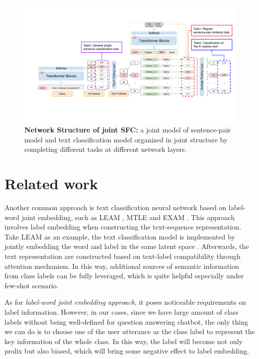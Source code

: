 \documentclass[letterpaper]{article} %
\begin{document}
  \begin{figure}[t]
    \begin{centering}
      \includegraphics[scale=0.72]{picture/picture4} 
      \par
    \end{centering}
    \caption{
      \textbf{Network   Structure   of  joint  SFC:}  a  joint  model  of
      sentence-pair   model   and   text   classification   model  organized  in
      joint  structure by completing different tasks at different network
      layers.
    }
    \label{fig:framework}
  \end{figure}

  \section{Related work}

  Another  common  approach  is  text  classification  neural  network  based on
  label-word     joint     embedding,    such    as    LEAM \cite{wang2018joint},
  MTLE \cite{zhang2017multi}   and   EXAM \cite{du2019explicit}.   This   approach
  involves  label  embedding when constructing the text-sequence representation.
  Take  LEAM  as  an  example,  the  text classification model is implemented by
  jointly    embedding    the    word    and    label   in   the   same   latent
  space \cite{wang2018joint}. Afterwards, the text representation are constructed
  based  on  text-label  compatibility through attention mechanism. In this way,
  additional  sources  of  semantic  information  from class labels can be fully
  leveraged, which is quite helpful especially under few-shot scenario.

  As for \emph{label-word joint
  embedding  approach},  it  poses  noticeable requirements on label information.
  However,  in  our  cases,  since  we have large amount of class labels without
  being well-defined for question answering chatbot, the only thing we can do is
  to  choose  one  of the user utterance as the class label to represent the key
  information  of  the  whole class. In this way, the label will become not only
  prolix  but  also  biased,  which  will  bring  some  negative effect to label
  embedding.  
\end{document}
